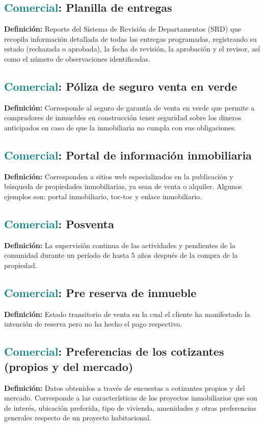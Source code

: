 \documentclass[12pt]{article}
\begin{document}
\subsection{\textcolor{teal}{Comercial}: Planilla de entregas}
\textbf{Definición:} Reporte del Sistema de Revisión de Departamentos (SRD) que recopila información detallada de todas las entregas programadas, registrando su estado (rechazada o aprobada), la fecha de revisión, la aprobación y el revisor, así como el número de observaciones identificadas.
\subsection{\textcolor{teal}{Comercial}: Póliza de seguro venta en verde}
\textbf{Definición:} Corresponde al seguro de garantía de venta en verde que permite a compradores de inmuebles en construcción tener seguridad sobre los dineros anticipados en caso de que la inmobiliaria no cumpla con sus obligaciones.
\subsection{\textcolor{teal}{Comercial}: Portal de información inmobiliaria}
\textbf{Definición:} Corresponden a sitios web especializados en la publicación y búsqueda de propiedades inmobiliarias, ya sean de venta o alquiler. Algunos ejemplos son: portal inmobiliario, toc-toc y enlace inmobiliario.
\subsection{\textcolor{teal}{Comercial}: Posventa}
\textbf{Definición:} La supervisión continua de las actividades y pendientes de la comunidad durante un período de hasta 5 años después de la compra de la propiedad.
\subsection{\textcolor{teal}{Comercial}: Pre reserva de inmueble}
\textbf{Definición:} Estado transitorio de venta en la cual el cliente ha manifestado la intención de reserva pero no ha hecho el pago respectivo.
\subsection{\textcolor{teal}{Comercial}: Preferencias de los cotizantes (propios y del mercado)}
\textbf{Definición:} Datos obtenidos a través de encuestas a cotizantes propios y del mercado. Corresponde a las características de los proyectos inmobiliarios que son de interés, ubicación preferida, tipo de vivienda, amenidades y otras preferencias generales respecto de un proyecto habitacional.
\end{document}
